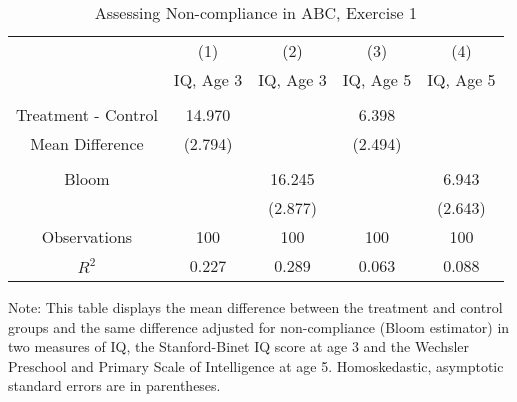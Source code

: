 \begin{table}[H] 
\begin{threeparttable}
\caption{Assessing Non-compliance in ABC, Exercise 1}
\label{table:nc1}
\centering 
\begin{tabular}{ccccc} \toprule
 & (1) & (2) & (3) & (4) \\
 & IQ, Age 3 & IQ, Age 3  & IQ, Age 5 & IQ, Age 5 \\ \midrule
 &  &  & & \\
Treatment - Control & 14.970 &  & 6.398 &  \\
 Mean Difference & (2.794) &  & (2.494) &  \\
  &  &  & & \\
Bloom &  & 16.245 &  & 6.943 \\
 &  & (2.877) &  & (2.643) \\ \midrule
Observations & 100 & 100 & 100 & 100  \\
 $R^2$ & 0.227 & 0.289 & 0.063 & 0.088 \\ \bottomrule
 \end{tabular}
\begin{tablenotes}
\footnotesize
\item Note: This table displays the mean difference between the treatment and control groups and the same difference adjusted for non-compliance (Bloom estimator) in two measures of IQ, the Stanford-Binet IQ score at age 3 and the Wechsler Preschool and Primary Scale of Intelligence at age 5. Homoskedastic, asymptotic standard errors are in parentheses.
\end{tablenotes}
\end{threeparttable}
\end{table}
